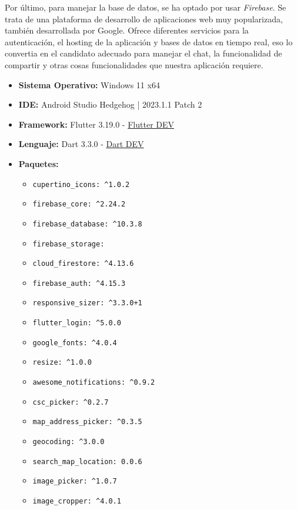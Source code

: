 \documentclass[a4paper, 12pt]{article}
\begin{document}
Por último, para manejar la base de datos, se ha optado por usar \textit{Firebase}. Se trata de una plataforma de desarrollo de aplicaciones web muy popularizada, también desarrollada por Google. Ofrece diferentes servicios para la autenticación, el hosting de la aplicación y bases de datos en tiempo real, eso lo convertia en el candidato adecuado para manejar el chat, la funcionalidad de compartir y otras cosas funcionalidades que nuestra aplicación requiere.

\begin{itemize}[noitemsep]
	\item \textbf{Sistema Operativo:} Windows 11 x64
	\item \textbf{IDE:} Android Studio Hedgehog | 2023.1.1 Patch 2
	\item \textbf{Framework:} Flutter 3.19.0 -  \href{https://flutter.dev/6}{Flutter DEV} \cite{flutter_dev}
	\item \textbf{Lenguaje:} Dart 3.3.0 - \href{https://dart.dev/}{Dart DEV} \cite{dart_dev}
	\item \textbf{Paquetes:}
		\begin{itemize}[noitemsep]
		  \item \texttt{cupertino\_icons: \^{}1.0.2}
		  \item \texttt{firebase\_core: \^{}2.24.2}
		  \item \texttt{firebase\_database: \^{}10.3.8}
		  \item \texttt{firebase\_storage:}
		  \item \texttt{cloud\_firestore: \^{}4.13.6}
		  \item \texttt{firebase\_auth: \^{}4.15.3}
		  \item \texttt{responsive\_sizer: \^{}3.3.0+1}
		  \item \texttt{flutter\_login: \^{}5.0.0}
		  \item \texttt{google\_fonts: \^{}4.0.4}
		  \item \texttt{resize: \^{}1.0.0}
		  \item \texttt{awesome\_notifications: \^{}0.9.2}
		  \item \texttt{csc\_picker: \^{}0.2.7}
		  \item \texttt{map\_address\_picker: \^{}0.3.5}
		  \item \texttt{geocoding: \^{}3.0.0}
		  \item \texttt{search\_map\_location: 0.0.6}
		  \item \texttt{image\_picker: \^{}1.0.7}
		  \item \texttt{image\_cropper: \^{}4.0.1}

\end{itemize}
\end{itemize}
\end{document}
